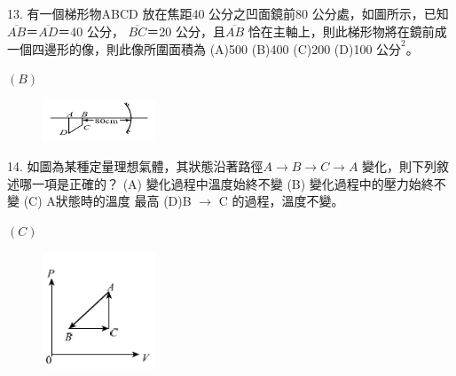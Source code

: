 \documentclass[cn,10pt,math=newtx,chinesefont=founder,device=ig]{elegantbook}
\begin{document}
\newpage


\begin{example}
   13. 有一個梯形物ABCD 放在焦距40 公分之凹面鏡前80 公分處，如圖所示，已知$\overline{AB} ＝
\overline{AD} ＝40$ 公分， $\overline{BC} ＝$20 公分，且$\overline{AB}$ 恰在主軸上，則此梯形物將在鏡前成一個四邊形的像，則此像所圍面積為
(A)500 (B)400 (C)200 (D)100 $公分^2$。\\
    \rightline{[全國聯招教甄109]}
\end{example}
\begin{solution}
    $(B)$
\end{solution}
\begin{figure}[htbp]
    \flushright
    \includegraphics[width=0.3\textwidth]{image/109全國13.png}
  \end{figure}
\newpage



\begin{example}
   14. 如圖為某種定量理想氣體，其狀態沿著路徑$A\rightarrow B\rightarrow C\rightarrow A$ 變化，則下列敘述哪一項是正確的？ (A) 變化過程中溫度始終不變 (B) 變化過程中的壓力始終不變 (C) A狀態時的溫度
最高 (D)B $\rightarrow$ C 的過程，溫度不變。\\
    \rightline{[全國聯招教甄109]}
\end{example}
\begin{solution}
    $(C)$
\end{solution}
\begin{figure}[htbp]
    \flushright
    \includegraphics[width=0.3\textwidth]{image/109全國14.png}
  \end{figure}
\newpage
\end{document}
